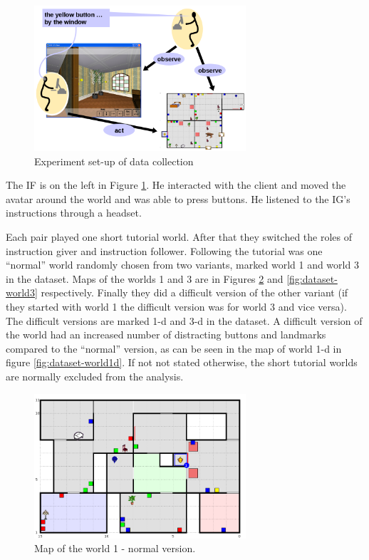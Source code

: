 \begin{figure}[!htbp]
  \centering
	\includegraphics[width=0.7\textwidth]{Images/experiment-set-up}
	\caption{Experiment set-up of data collection}
	\label{fig:give-experiment-setup}
\end{figure}

The IF is on the left in Figure \ref{fig:give-experiment-setup}. He interacted with the client and moved the avatar around the world and was able to press buttons. He listened to the IG's instructions through a headset.

Each pair played one short tutorial world. After that they switched the roles of instruction giver and instruction follower. Following the tutorial was one ``normal'' world randomly chosen from two variants, marked world 1 and world 3 in the dataset. Maps of the worlds 1 and 3 are in Figures \ref{fig:dataset-world1} and \ref{fig:dataset-world3} respectively. Finally they did a difficult version of the other variant (if they started with world 1 the difficult version was for world 3 and vice versa). The difficult versions are marked 1-d and 3-d in the dataset. A difficult version of the world had an increased number of distracting buttons and landmarks compared to the ``normal'' version, as can be seen in the map of world 1-d in figure \ref{fig:dataset-world1d}. If not not stated otherwise, the short tutorial worlds are normally excluded from the analysis.

\begin{figure}[!htbp]
  \centering
	\includegraphics[width=0.7\textwidth]{Images/dataset-world1}
	\caption{Map of the world 1 - normal version.}
	\label{fig:dataset-world1}
\end{figure}

